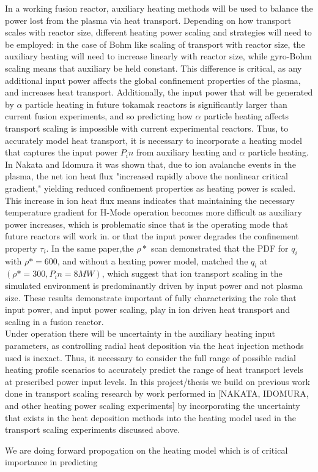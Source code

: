 \documentclass{article}
\begin{document}
In a working fusion reactor, auxiliary heating methods will be used to balance the power lost from the plasma via heat transport. Depending on how transport scales with reactor size, different heating power scaling and strategies will need to be employed: in the case of Bohm like scaling of transport with reactor size, the auxiliary heating will need to increase linearly with reactor size, while gyro-Bohm scaling means that auxiliary be held constant. This difference is critical, as any additional input power affects the global confinement properties of the plasma, and increases heat transport. Additionally, the input power that will be generated by $\alpha$ particle heating in future tokamak reactors is significantly larger than current fusion experiments, and so predicting how $\alpha$ particle heating affects transport scaling is impossible with current experimental reactors.  Thus, to accurately model heat transport, it is necessary to incorporate a heating model that captures the input power $P_in$ from auxiliary heating and $\alpha$ particle heating.\\

In Nakata and Idomura it was shown that, due to ion avalanche events in the plasma, the net ion heat flux "increased rapidly above the nonlinear critical gradient," yielding reduced confinement properties as heating power is scaled. This increase in ion heat flux means indicates that maintaining the necessary temperature gradient for H-Mode operation becomes more difficult as auxiliary power increases, which is problematic since that is the operating mode that future reactors will work in. or that the input power degrades the confinement property $\tau_i$. In the same paper,the $\rho*$ scan demonstrated that the PDF for $q_i$ with $\rho* = 600$, and without a heating power model, matched the $q_i$ at $(\rho* = 300, P_in = 8MW)$, which suggest that ion transport scaling in the simulated environment is predominantly driven by input power and not plasma size. These results demonstrate important of fully characterizing the role that input power, and input power scaling, play in ion driven heat transport and scaling in a fusion reactor.\\
Under operation there will be uncertainty in the auxiliary heating input parameters, as controlling radial heat deposition via the heat injection methods used is inexact. Thus, it necessary to consider the full range of possible radial heating profile scenarios to accurately predict the range of heat transport levels at prescribed power input levels. In this project/thesis we build on previous work done in transport scaling research by work performed in [NAKATA, IDOMURA, and other heating power scaling experiments] by incorporating the uncertainty that exists in the heat deposition methods into the heating model used in the transport scaling experiments discussed above.

We are doing forward propogation on the heating model which is of critical importance  in predicting
\end{document}

